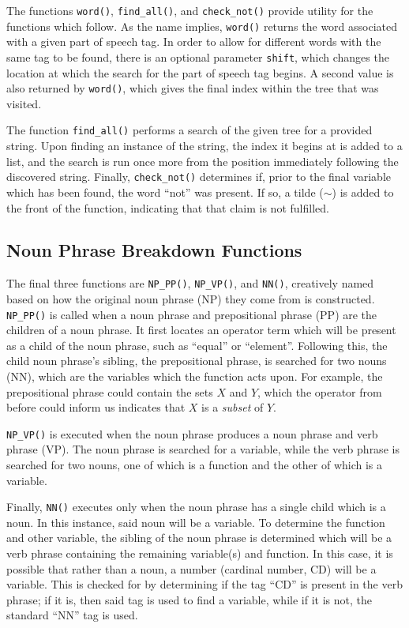 The functions \texttt{word()}, \texttt{find\_all()}, and \texttt{check\_not()} provide utility for the functions which follow. As the name implies, \texttt{word()} returns the word associated with a given part of speech tag. In order to allow for different words with the same tag to be found, there is an optional parameter \texttt{shift}, which changes the location at which the search for the part of speech tag begins. A second value is also returned by \texttt{word()}, which gives the final index within the tree that was visited.

The function \texttt{find\_all()} performs a search of the given tree for a provided string. Upon finding an instance of the string, the index it begins at is added to a list, and the search is run once more from the position immediately following the discovered string. Finally, \texttt{check\_not()} determines if, prior to the final variable which has been found, the word ``not'' was present. If so, a tilde ($\sim$) is added to the front of the function, indicating that that claim is not fulfilled.

\subsection{Noun Phrase Breakdown Functions}

The final three functions are \texttt{NP\_PP()}, \texttt{NP\_VP()}, and \texttt{NN()}, creatively named based on how the original noun phrase (NP) they come from is constructed. \texttt{NP\_PP()} is called when a noun phrase and prepositional phrase (PP) are the children of a noun phrase. It first locates an operator term which will be present as a child of the noun phrase, such as ``equal'' or ``element''. Following this, the child noun phrase's sibling, the prepositional phrase, is searched for two nouns (NN), which are the variables which the function acts upon. For example, the prepositional phrase could contain the sets $X$ and $Y$, which the operator from before could inform us indicates that $X$ is a \textit{subset} of $Y$.

\label{npvp}
\texttt{NP\_VP()} is executed when the noun phrase produces a noun phrase and verb phrase (VP). The noun phrase is searched for a variable, while the verb phrase is searched for two nouns, one of which is a function and the other of which is a variable.

Finally, \texttt{NN()} executes only when the noun phrase has a single child which is a noun. In this instance, said noun will be a variable. To determine the function and other variable, the sibling of the noun phrase is determined which will be a verb phrase containing the remaining variable(s) and function. In this case, it is possible that rather than a noun, a number (cardinal number, CD) will be a variable. This is checked for by determining if the tag ``CD'' is present in the verb phrase; if it is, then said tag is used to find a variable, while if it is not, the standard ``NN'' tag is used.

